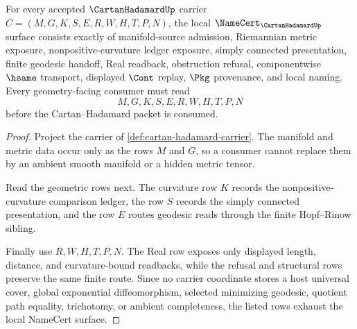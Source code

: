 \begin{theorem}
\label{thm:cartan-hadamard-namecert-obligations}
For every accepted $\CartanHadamardUp$ carrier $C=(M,G,K,S,E,R,W,H,T,P,N)$, the local $\NameCert_{\CartanHadamardUp}$ surface consists exactly of manifold-source admission, Riemannian metric exposure, nonpositive-curvature ledger exposure, simply connected presentation, finite geodesic handoff, Real readback, obstruction refusal, componentwise $\hsame$ transport, displayed $\Cont$ replay, $\Pkg$ provenance, and local naming. Every geometry-facing consumer must read
$$
M,G,K,S,E,R,W,H,T,P,N
$$
before the Cartan--Hadamard packet is consumed.
\end{theorem}
\begin{proof}
Project the carrier of \autoref{def:cartan-hadamard-carrier}. The manifold and metric data occur only as the rows $M$ and $G$, so a consumer cannot replace them by an ambient smooth manifold or a hidden metric tensor.

Read the geometric rows next. The curvature row $K$ records the nonpositive-curvature comparison ledger, the row $S$ records the simply connected presentation, and the row $E$ routes geodesic reads through the finite Hopf--Rinow sibling.

Finally use $R,W,H,T,P,N$. The Real row exposes only displayed length, distance, and curvature-bound readbacks, while the refusal and structural rows preserve the same finite route. Since no carrier coordinate stores a host universal cover, global exponential diffeomorphism, selected minimizing geodesic, quotient path equality, trichotomy, or ambient completeness, the listed rows exhaust the local NameCert surface.
\end{proof}

